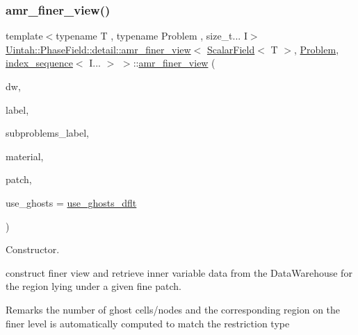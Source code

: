 \subsubsection{\texorpdfstring{amr\+\_\+finer\+\_\+view()}{amr\_finer\_view()}\hspace{0.1cm}{\footnotesize\ttfamily [3/4]}}
{\footnotesize\ttfamily template$<$typename T , typename Problem , size\+\_\+t... I$>$ \\
\hyperlink{classUintah_1_1PhaseField_1_1detail_1_1amr__finer__view}{Uintah\+::\+Phase\+Field\+::detail\+::amr\+\_\+finer\+\_\+view}$<$ \hyperlink{structUintah_1_1PhaseField_1_1ScalarField}{Scalar\+Field}$<$ T $>$, \hyperlink{classUintah_1_1PhaseField_1_1Problem}{Problem}, \hyperlink{namespaceUintah_1_1PhaseField_a237de804d99512e50613aff7c94a9461}{index\+\_\+sequence}$<$ I... $>$ $>$\+::\hyperlink{classUintah_1_1PhaseField_1_1detail_1_1amr__finer__view}{amr\+\_\+finer\+\_\+view} (\begin{DoxyParamCaption}\item[{Data\+Warehouse $\ast$}]{dw,  }\item[{const Var\+Label $\ast$}]{label,  }\item[{const Var\+Label $\ast$}]{subproblems\+\_\+label,  }\item[{int}]{material,  }\item[{const Patch $\ast$}]{patch,  }\item[{bool}]{use\+\_\+ghosts = {\ttfamily \hyperlink{classUintah_1_1PhaseField_1_1detail_1_1amr__finer__view_3_01ScalarField_3_01T_01_4_00_01Problem_810ae3f886a4d3bdb2b37c629369a2ec_aee5138b1c87ec5e7717b5f1dd6fd47cd}{use\+\_\+ghosts\+\_\+dflt}} }\end{DoxyParamCaption})\hspace{0.3cm}{\ttfamily [inline]}}



Constructor. 

construct finer view and retrieve inner variable data from the Data\+Warehouse for the region lying under a given fine patch.

\begin{DoxyRemark}{Remarks}
the number of ghost cells/nodes and the corresponding region on the finer level is automatically computed to match the restriction type
\end{DoxyRemark}

